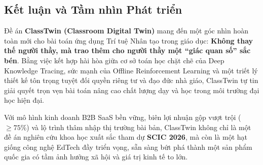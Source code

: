 \subsection{Kết luận và Tầm nhìn Phát triển}\label{subsec:ket-luan}
Đề án \textbf{ClassTwin (Classroom Digital Twin)} mang đến một góc nhìn hoàn toàn mới cho bài toán ứng dụng Trí tuệ Nhân tạo trong giáo dục: \textbf{Không thay thế người thầy, mà trao thêm cho người thầy một ``giác quan số'' sắc bén}. Bằng việc kết hợp hài hòa giữa cơ sở toán học chặt chẽ của Deep Knowledge Tracing, sức mạnh của Offline Reinforcement Learning và một triết lý thiết kế tôn trọng tuyệt đối quyền riêng tư và đạo đức nhà giáo, ClassTwin tự tin giải quyết trọn vẹn bài toán nâng cao chất lượng dạy và học trong môi trường đại học hiện đại.

Với mô hình kinh doanh B2B SaaS bền vững, biên lợi nhuận gộp vượt trội ($\ge 75\%$) và lộ trình thâm nhập thị trường bài bản, ClassTwin không chỉ là một đề án nghiên cứu khoa học xuất sắc tham dự \textbf{SCIC 2026}, mà còn là một hạt giống công nghệ EdTech đầy triển vọng, sẵn sàng bứt phá thành một sản phẩm quốc gia có tầm ảnh hưởng xã hội và giá trị kinh tế to lớn.

\newpage

